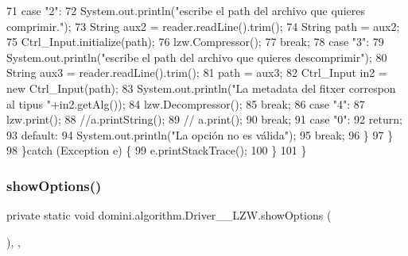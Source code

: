 \begin{DoxyCode}
71                 \textcolor{keywordflow}{case} \textcolor{stringliteral}{"2"}:
72                     System.out.println(\textcolor{stringliteral}{"escribe el path del archivo que quieres comprimir."});
73                     String aux2 = reader.readLine().trim();
74                     String path = aux2;
75                     Ctrl\_Input.initialize(path);
76                     lzw.Compressor();
77                 \textcolor{keywordflow}{break};
78                 \textcolor{keywordflow}{case} \textcolor{stringliteral}{"3"}:
79                     System.out.println(\textcolor{stringliteral}{"escribe el path del archivo que quieres descomprimir"});
80                     String aux3 = reader.readLine().trim();
81                     path = aux3;
82                     Ctrl\_Input in2 = \textcolor{keyword}{new} Ctrl\_Input(path);
83                     System.out.println(\textcolor{stringliteral}{"La metadata del fitxer correspon al tipus "}+in2.getAlg());
84                     lzw.Decompressor();
85                 \textcolor{keywordflow}{break};
86                 \textcolor{keywordflow}{case} \textcolor{stringliteral}{"4"}:
87                     lzw.print();
88                     \textcolor{comment}{//a.printString();}
89                     \textcolor{comment}{// a.print();                   }
90                 \textcolor{keywordflow}{break};
91                 \textcolor{keywordflow}{case} \textcolor{stringliteral}{"0"}:
92                     \textcolor{keywordflow}{return};
93                 \textcolor{keywordflow}{default}:
94                     System.out.println(\textcolor{stringliteral}{"La opción no es válida"});
95                 \textcolor{keywordflow}{break};
96             \}
97         \}
98     \}\textcolor{keywordflow}{catch} (Exception e) \{
99         e.printStackTrace();
100     \}
101     \}
\end{DoxyCode}
\mbox{\label{classdomini_1_1algorithm_1_1Driver____LZW_ad43ebe1afd0d4e5be51584c71a1789d2}} 
\subsubsection{\texorpdfstring{show\+Options()}{showOptions()}}
{\footnotesize\ttfamily private static void domini.\+algorithm.\+Driver\+\_\+\+\_\+\+L\+Z\+W.\+show\+Options (\begin{DoxyParamCaption}{ }\end{DoxyParamCaption})\hspace{0.3cm}{\ttfamily [inline]}, {\ttfamily [static]}, {\ttfamily [private]}}



